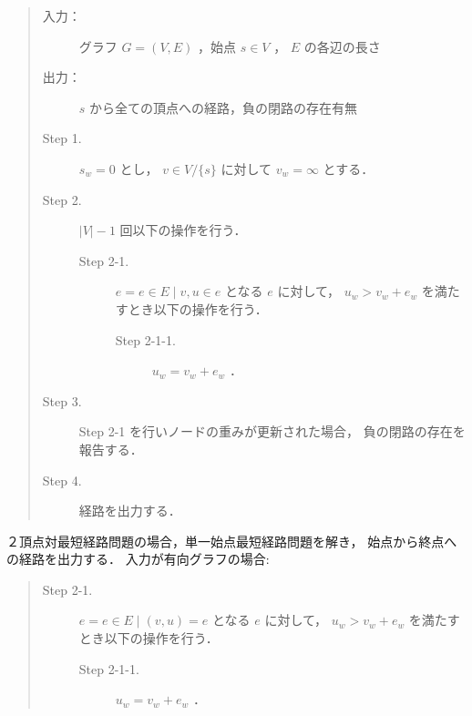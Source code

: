 \documentclass[12pt]{optlab-bachelor}
\begin{document}
\begin{itemize}
  \begin{quote}
    \begin{description}
      \item[入力：] グラフ $G=(V,E)$ ，始点 $s \in V$ ， $E$ の各辺の長さ
      \item[出力：] $s$ から全ての頂点への経路，負の閉路の存在有無
      \item[Step 1.] $s_w = 0$ とし， $v \in V/\{s\}$ に対して $v_w = \infty$ とする．
      \item[Step 2.] $|V|-1$ 回以下の操作を行う．
      \begin{description}
        \item[Step 2-1.] $e = {e \in E \mid v,u \in e}$ となる $e$ に対して，
        $u_w > v_w + e_w$ を満たすとき以下の操作を行う．
        \begin{description}
          \item[Step 2-1-1.] $u_w = v_w + e_w$ ．
        \end{description}
      \end{description}
      \item[Step 3.] Step 2-1 を行いノードの重みが更新された場合，
      負の閉路の存在を報告する．
      \item[Step 4.] 経路を出力する．
    \end{description}
  \end{quote}
  ２頂点対最短経路問題の場合，単一始点最短経路問題を解き，
  始点から終点への経路を出力する．
  入力が有向グラフの場合:
  \begin{quote}
    \begin{description}
      \item[Step 2-1.] $e = {e \in E \mid (v,u) = e}$ となる $e$ に対して，
      $u_w > v_w + e_w$ を満たすとき以下の操作を行う．
      \begin{description}
        \item[Step 2-1-1.] $u_w = v_w + e_w$ ．
      \end{description}
    \end{description}
  \end{quote}
\end{itemize}
\end{document}
